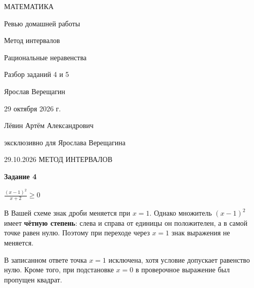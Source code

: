 \documentclass[a4paper,12pt]{article}
\newcommand{\topic}[1]{\par\medskip{\large\bfseries\color{accent}#1}\par\smallskip}
\newcommand{\eqtask}[1]{\begin{center}\vspace{2mm}\Large $#1$\vspace{2mm}\end{center}}
\begin{document}
\thispagestyle{empty}
\begin{center}
\vspace*{23mm}
{\large\color{accent}МАТЕМАТИКА}\par
\vspace{18mm}
{\LARGE Ревью домашней работы}\par
\vspace{12mm}
{\Large\color{accent}Метод интервалов\par
Рациональные неравенства}\par
\vspace{20mm}
{\normalsize Разбор заданий 4 и 5}\par
\vfill
{\large Ярослав Верещагин}\par
\vspace{10mm}
{29 октября 2026 г.}\par
\vspace{16mm}
{\small Лёвин Артём Александрович}\par
{\small эксклюзивно для Ярослава Верещагина}\par
\vspace{19mm}
\vspace{5mm}
\end{center}
\clearpage

{\footnotesize\color{muted}29.10.2026 \hfill МЕТОД ИНТЕРВАЛОВ}
\vspace{4mm}

{\LARGE\bfseries\color{accent}Задание 4}\par
\eqtask{\frac{(x-1)^2}{x+2}\ge 0}

\topic{Где возникла ошибка}
В Вашей схеме знак дроби меняется при $x=1$. Однако множитель $(x-1)^2$ имеет \textbf{чётную степень}: слева и справа от единицы он положителен, а в самой точке равен нулю. Поэтому при переходе через $x=1$ знак выражения не меняется.

В записанном ответе точка $x=1$ исключена, хотя условие допускает равенство нулю. Кроме того, при подстановке $x=0$ в проверочное выражение был пропущен квадрат.
\end{document}

